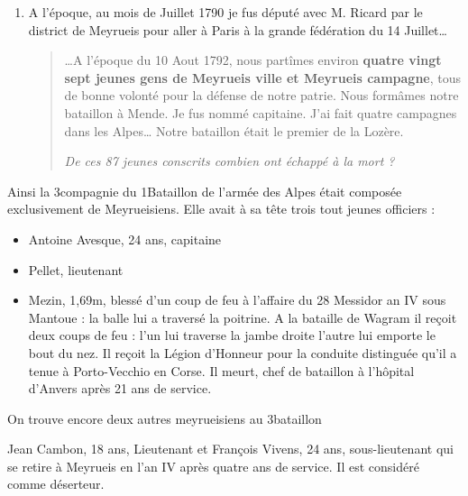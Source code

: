{\begin{enumerate}[label=\arabic*., leftmargin=2.0em, itemsep=0.55em, topsep=0.25em]
\item
A l’époque, au mois de Juillet 1790 je fus député avec M. Ricard par le district de Meyrueis pour aller à Paris à la
grande fédération du 14 Juillet…

\begin{quote}
…A l’époque du 10 Aout 1792, nous partîmes environ \textbf{quatre vingt sept jeunes gens de Meyrueis ville et
Meyrueis campagne}, tous de bonne volonté pour la défense de notre patrie. Nous formâmes notre bataillon à
Mende. Je fus nommé capitaine. J’ai fait quatre campagnes dans les Alpes… Notre bataillon était le premier de
la Lozère.

\textit{De ces 87 jeunes conscrits combien ont échappé à la mort ?}
\end{quote}
\end{enumerate}

\vspace{0.15em}

Ainsi la 3\ieme compagnie du 1\ier Bataillon de l’armée des Alpes était composée
exclusivement de Meyrueisiens. Elle avait à sa tête trois tout jeunes officiers :

\begin{itemize}[leftmargin=1.8em, itemsep=0.18em, topsep=0.2em]
\item Antoine Avesque, 24 ans, capitaine
\item Pellet, lieutenant
\item Mezin, 1,69m, blessé d’un coup de feu à l’affaire du 28 Messidor an IV sous Mantoue :
la balle lui a traversé la poitrine. A la bataille de Wagram il reçoit deux coups de feu :
l’un lui traverse la jambe droite l’autre lui emporte le bout du nez. Il reçoit la Légion
d’Honneur pour la conduite distinguée qu’il a tenue à Porto-Vecchio en Corse. Il
meurt, chef de bataillon à l’hôpital d’Anvers après 21 ans de service.
\end{itemize}

On trouve encore deux autres meyrueisiens au 3\ieme bataillon

Jean Cambon, 18 ans, Lieutenant et François Vivens, 24 ans, sous-lieutenant qui se
retire à Meyrueis en l’an IV après quatre ans de service. Il est considéré comme
déserteur.

}

